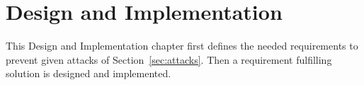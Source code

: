 \section{Design and Implementation}
\label{sec:designandimplementation}
This Design and Implementation chapter first defines the needed requirements to prevent given attacks of Section~\ref{sec:attacks}. Then a requirement fulfilling solution is designed and implemented.


